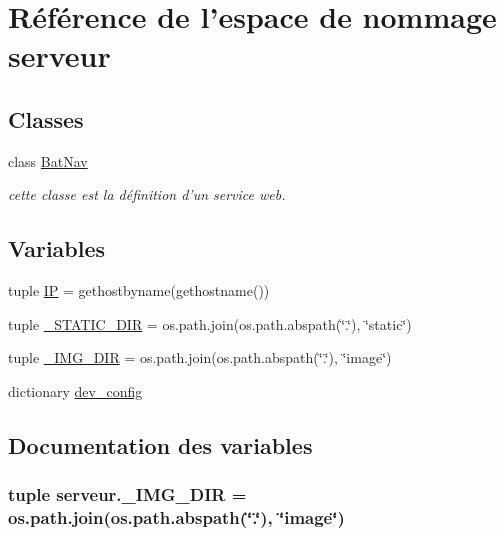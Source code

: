 \hypertarget{namespaceserveur}{\section{Référence de l'espace de nommage serveur}
\label{namespaceserveur}
}
\subsection*{Classes}
\begin{DoxyCompactItemize}
\item 
class \hyperlink{classserveur_1_1BatNav}{Bat\-Nav}
\begin{DoxyCompactList}\small\item\em cette classe est la définition d'un service web. \end{DoxyCompactList}\end{DoxyCompactItemize}
\subsection*{Variables}
\begin{DoxyCompactItemize}
\item 
tuple \hyperlink{namespaceserveur_adc80b043dfed2687ba0a7312af3e9745}{I\-P} = gethostbyname(gethostname())
\item 
tuple \hyperlink{namespaceserveur_a67de12cb5d8d1fc1b938786191e6e7a3}{\-\_\-\-S\-T\-A\-T\-I\-C\-\_\-\-D\-I\-R} = os.\-path.\-join(os.\-path.\-abspath(\char`\"{}.\char`\"{}), \char`\"{}static\char`\"{})
\item 
tuple \hyperlink{namespaceserveur_a5ce039b3cd10a2e56aaf62d7ca139490}{\-\_\-\-I\-M\-G\-\_\-\-D\-I\-R} = os.\-path.\-join(os.\-path.\-abspath(\char`\"{}.\char`\"{}), \char`\"{}image\char`\"{})
\item 
dictionary \hyperlink{namespaceserveur_ab0d89e80607d8c3e353fbdec568c25c1}{dev\-\_\-config}
\end{DoxyCompactItemize}


\subsection{Documentation des variables}
\hypertarget{namespaceserveur_a5ce039b3cd10a2e56aaf62d7ca139490}{
\subsubsection[{\-\_\-\-I\-M\-G\-\_\-\-D\-I\-R}]{\setlength{\rightskip}{0pt plus 5cm}tuple serveur.\-\_\-\-I\-M\-G\-\_\-\-D\-I\-R = os.\-path.\-join(os.\-path.\-abspath(\char`\"{}.\char`\"{}), \char`\"{}image\char`\"{})}}\label{namespaceserveur_a5ce039b3cd10a2e56aaf62d7ca139490}


